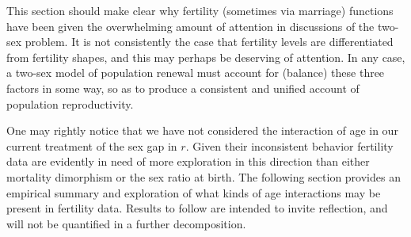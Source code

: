 This section should make clear why fertility (sometimes via marriage) functions
have been given the overwhelming amount of attention in discussions of the two-sex
problem. It is not consistently the case that fertility levels are
differentiated from fertility shapes, and this may perhaps be deserving of
attention. In any case, a two-sex model of population renewal must account for
(balance) these three factors in some way, so as to produce a consistent and 
unified account of population reproductivity.

One may rightly notice that we have not considered the interaction of age in our
current treatment of the sex gap in $r$. Given their inconsistent behavior
fertility data are evidently in need of more exploration in this direction than
either mortality dimorphism or the sex ratio at birth. The following section 
provides an empirical summary and exploration of what kinds of age interactions
may be present in fertility data. Results to follow are intended to invite
reflection, and will not be quantified in a further decomposition. 
 \FloatBarrier